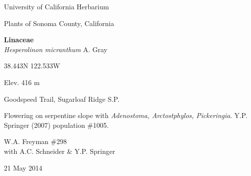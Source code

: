 \documentclass[letterpaper,10pt]{article}
\begin{document}
\begin{minipage}[t]{0.40\textwidth}

\begin{center}
University of California Herbarium \\
\begin{large}
Plants of Sonoma County, California \\
\end{large}
\vspace{\baselineskip}
\textbf{Linaceae} \\
\textit{Hesperolinon micranthum} A. Gray\\
\end{center}

\begin{footnotesize}

\begin{multicols}{2}
38.443\textdegree N 122.533\textdegree W
\columnbreak
\begin{flushright}
Elev. 416 m
\end{flushright}
\end{multicols}

Goodspeed Trail, Sugarloaf Ridge S.P.
\vspace{\baselineskip}

Flowering on serpentine slope with \textit{Adenostoma, Arctostphylos, Pickeringia}. Y.P. Springer (2007) population \#1005.

\begin{multicols}{2}
W.A. Freyman \#298 \\
with A.C. Schneider \& Y.P. Springer
\columnbreak
\begin{flushright}
21 May 2014
\end{flushright}
\end{multicols}

\end{footnotesize}

\end{minipage}

\vspace{2cm}
%
%
\end{document}
